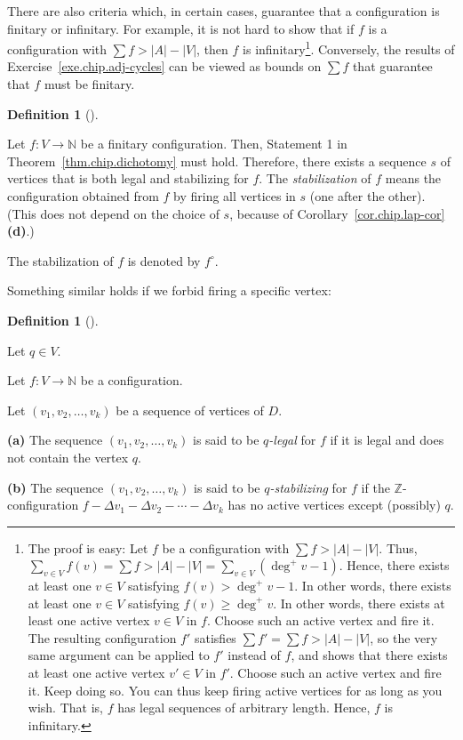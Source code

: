 \documentclass[numbers=enddot,12pt,final,onecolumn,notitlepage]{scrartcl}%
\theoremstyle{definition}
\newtheorem{defi}[theo]{Definition}
\newenvironment{definition}[1][]
{\begin{defi}[#1]\begin{leftbar}}
{\end{leftbar}\end{defi}}
\let\sumnonlimits\sum
\renewcommand{\sum}{\sumnonlimits\limits}
\newcommand{\NN}{\mathbb{N}}
\newcommand{\ZZ}{\mathbb{Z}}
\newcommand{\abs}[1]{\left| #1 \right|}
\newcommand{\tup}[1]{\left( #1 \right)}
\begin{document}
There are also criteria which, in certain cases, guarantee
that a configuration is finitary or infinitary.
For example, it is not hard to show that if $f$ is a
configuration with $\sum f > \abs{A} - \abs{V}$,
then $f$ is infinitary\footnote{The proof is easy:
Let $f$ be a configuration with
$\sum f > \abs{A} - \abs{V}$.
Thus, $\sum_{v \in V} f \tup{v} = \sum f > \abs{A} - \abs{V}
= \sum_{v \in V} \tup{\deg^+ v - 1}$.
Hence, there exists at least one $v \in V$ satisfying
$f \tup{v} > \deg^+ v - 1$.
In other words, there exists at least one $v \in V$ satisfying
$f \tup{v} \geq \deg^+ v$.
In other words, there exists at least one active vertex
$v \in V$ in $f$.
Choose such an active vertex and fire it.
The resulting configuration $f'$ satisfies
$\sum f' = \sum f > \abs{A} - \abs{V}$,
so the very same argument can be applied to $f'$ instead
of $f$, and shows that there exists at least one active
vertex $v' \in V$ in $f'$.
Choose such an active vertex and fire it.
Keep doing so.
You can thus keep firing active vertices for
as long as you wish.
That is, $f$ has legal sequences of arbitrary length.
Hence, $f$ is infinitary.}.
Conversely, the results of
Exercise~\ref{exe.chip.adj-cycles} can be viewed as
bounds on $\sum f$ that guarantee that $f$ must be
finitary.

\begin{definition} \label{def.chip.stabilization}
Let $f : V \to \NN$ be a finitary configuration.
Then, Statement 1 in Theorem~\ref{thm.chip.dichotomy} must
hold.
Therefore, there exists a sequence $s$ of vertices that is both
legal and stabilizing for $f$.
The \textit{stabilization} of $f$ means
the configuration obtained from $f$ by firing
all vertices in $s$ (one after the other).
(This does not depend on the choice of $s$, because of
Corollary~\ref{cor.chip.lap-cor} \textbf{(d)}.)

The stabilization of $f$ is denoted by $f^\circ$.
\end{definition}

Something similar holds if we forbid firing a specific
vertex:

\begin{definition}
Let $q \in V$.

Let $f : V \to \NN$ be a configuration.

Let $\tup{v_1, v_2, \ldots, v_k}$ be a sequence of vertices of
$D$.

\textbf{(a)} The sequence $\tup{v_1, v_2, \ldots, v_k}$ is said
to be \textit{$q$-legal} for $f$ if it is legal and does not
contain the vertex $q$.

\textbf{(b)} The sequence $\tup{v_1, v_2, \ldots, v_k}$ is said
to be \textit{$q$-stabilizing} for $f$ if the $\ZZ$-configuration
$f - \Delta v_1 - \Delta v_2 - \cdots - \Delta v_k$ has no
active vertices except (possibly) $q$.
\end{definition}
\end{document}
